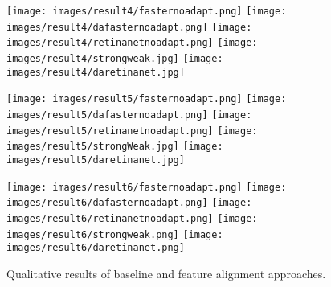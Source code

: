 \documentclass[preprint]{elsarticle}
\begin{document}
\begin{figure*}[t!]
            \vspace{1mm}
            \texttt{[image: images/result4/fasternoadapt.png]}
            \texttt{[image: images/result4/dafasternoadapt.png]}
            \texttt{[image: images/result4/retinanetnoadapt.png]}
            \texttt{[image: images/result4/strongweak.jpg]}
            \texttt{[image: images/result4/daretinanet.jpg]}
            
            \vspace{1mm}
            \texttt{[image: images/result5/fasternoadapt.png]}
            \texttt{[image: images/result5/dafasternoadapt.png]}
            \texttt{[image: images/result5/retinanetnoadapt.png]}
            \texttt{[image: images/result5/strongWeak.jpg]}
            \texttt{[image: images/result5/daretinanet.jpg]}
            
            \vspace{1mm}
            \texttt{[image: images/result6/fasternoadapt.png]}
            \texttt{[image: images/result6/dafasternoadapt.png]}
            \texttt{[image: images/result6/retinanetnoadapt.png]}
            \texttt{[image: images/result6/strongweak.png]}
            \texttt{[image: images/result6/daretinanet.png]}

            \caption{Qualitative results of baseline and feature alignment approaches.}
            \label{fig:qualitativeresult}
\end{figure*}
\end{document}
